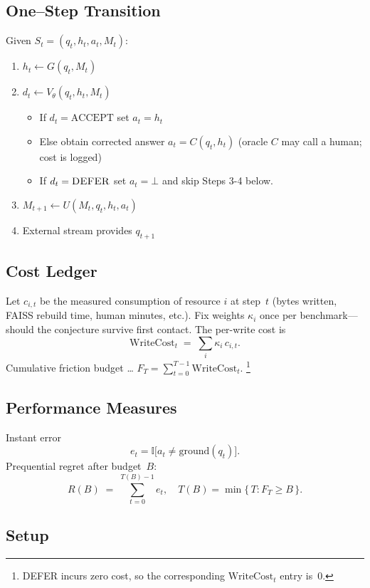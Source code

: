 \documentclass[11pt]{article}
\newcommand{\WriteCost}{\mathrm{WriteCost}}
\begin{document}
\subsection{One--Step Transition}
\label{sec:transition}

Given $S_t=(q_t,h_t,a_t,M_t)$:
\begin{enumerate}
  \item $h_t \leftarrow G(q_t,M_t)$
  \item $d_t \leftarrow V_\theta(q_t,h_t,M_t)$
        \begin{itemize}
          \item If $d_t=\mathrm{ACCEPT}$ set $a_t=h_t$
          \item Else obtain corrected answer $a_t = C(q_t,h_t)$
                (oracle $C$ may call a human; cost is logged)
          \item If $d_t=\textsc{DEFER}$ set $a_t=\bot$
                and skip Steps 3-4 below.
        \end{itemize}
  \item $M_{t+1} \leftarrow U(M_t,q_t,h_t,a_t)$
  \item External stream provides $q_{t+1}$
\end{enumerate}

\subsection{Cost Ledger}
\label{sec:cost-ledger}

Let $c_{i,t}$ be the measured consumption of resource $i$ at step~$t$
(bytes written, FAISS rebuild time, human minutes, etc.).
Fix weights $\kappa_i$ once per benchmark—should the conjecture survive first contact.  The per-write cost is
\[
  \WriteCost_t \;=\; \sum_i \kappa_i\,c_{i,t}.
\]
Cumulative friction budget …  $F_T = \sum_{t=0}^{T-1}\WriteCost_t$.%
\footnote{\textsc{DEFER} incurs zero cost, so the corresponding
$\WriteCost_t$ entry is~0.}

\subsection{Performance Measures}
\label{sec:performance-measures}

Instant error
\[
  e_t = \mathbb{I}\bigl[a_t \neq \text{ground}(q_t)\bigr].
\]
Prequential regret after budget~$B$:
\[
  R(B) \;=\; \sum_{t=0}^{T(B)-1} e_t,
  \quad
  T(B) = \min\{\,T : F_T \ge B\,\}.
\]

\subsection{Setup}\label{sec:setup}
\end{document}
